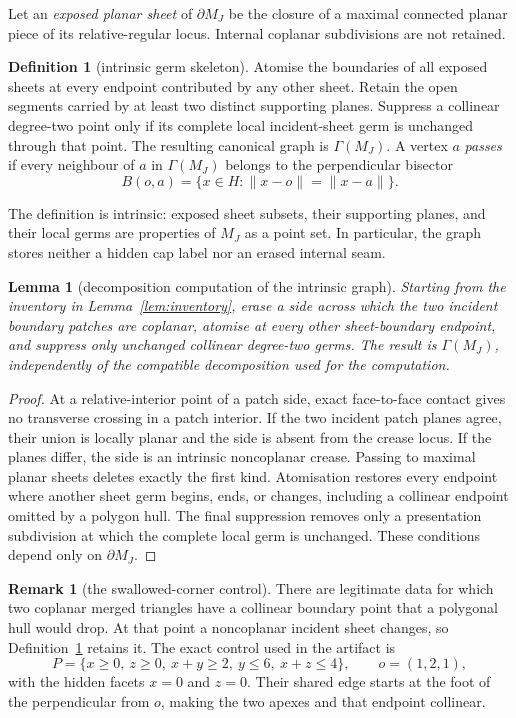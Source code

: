 \documentclass[11pt]{amsart}
\newtheorem{lemma}[theorem]{Lemma}
\theoremstyle{definition}
\newtheorem{definition}[theorem]{Definition}
\newtheorem{remark}[theorem]{Remark}
\newcommand{\GammaM}{\Gamma(M_J)}
\begin{document}
Let an \emph{exposed planar sheet} of $\partial M_J$ be the closure of a
maximal connected planar piece of its relative-regular locus.  Internal
coplanar subdivisions are not retained.

\begin{definition}[intrinsic germ skeleton]
\label{def:skeleton}
Atomise the boundaries of all exposed sheets at every endpoint contributed by
any other sheet.  Retain the open segments carried by at least two distinct
supporting planes.  Suppress a collinear degree-two point only if its complete
local incident-sheet germ is unchanged through that point.  The resulting
canonical graph is $\GammaM$.  A vertex $a$ \emph{passes} if every neighbour
of $a$ in $\GammaM$ belongs to the perpendicular bisector
\[
 B(o,a)=\{x\in H:\|x-o\|=\|x-a\|\}.
\]
\end{definition}

The definition is intrinsic: exposed sheet subsets, their supporting planes,
and their local germs are properties of $M_J$ as a point set.  In particular,
the graph stores neither a hidden cap label nor an erased internal seam.

\begin{lemma}[decomposition computation of the intrinsic graph]
\label{lem:graph-intrinsic}
Starting from the inventory in Lemma~\ref{lem:inventory}, erase a side across
which the two incident boundary patches are coplanar, atomise at every other
sheet-boundary endpoint, and suppress only unchanged collinear degree-two
germs.  The result is $\GammaM$, independently of the compatible
decomposition used for the computation.
\end{lemma}

\begin{proof}
At a relative-interior point of a patch side, exact face-to-face contact gives
no transverse crossing in a patch interior.  If the two incident patch planes
agree, their union is locally planar and the side is absent from the crease
locus.  If the planes differ, the side is an intrinsic noncoplanar crease.
Passing to maximal planar sheets deletes exactly the first kind.  Atomisation
restores every endpoint where another sheet germ begins, ends, or changes,
including a collinear endpoint omitted by a polygon hull.  The final
suppression removes only a presentation subdivision at which the complete
local germ is unchanged.  These conditions depend only on $\partial M_J$.
\end{proof}

\begin{remark}[the swallowed-corner control]
There are legitimate data for which two coplanar merged triangles have a
collinear boundary point that a polygonal hull would drop.  At that point a
noncoplanar incident sheet changes, so Definition~\ref{def:skeleton} retains
it.  The exact control used in the artifact is
\[
 P=\{x\ge0,\ z\ge0,\ x+y\ge2,\ y\le6,\ x+z\le4\},
 \qquad o=(1,2,1),
\]
with the hidden facets $x=0$ and $z=0$.  Their shared edge starts at the foot
of the perpendicular from $o$, making the two apexes and that endpoint
collinear.
\end{remark}
\end{document}
